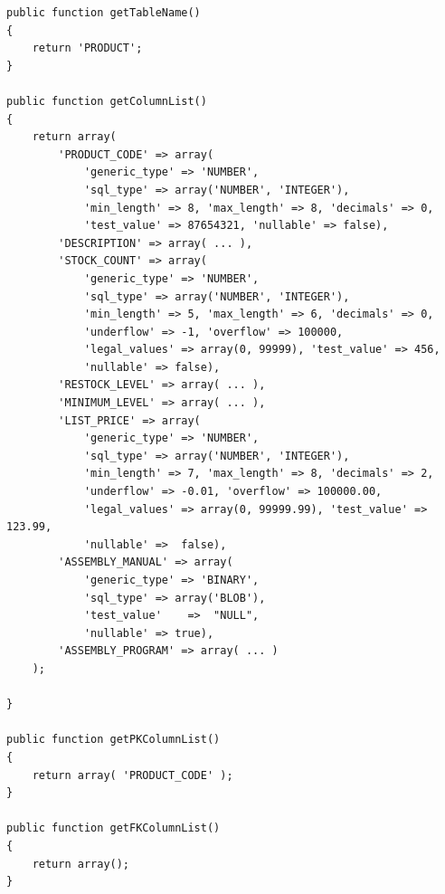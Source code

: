 \documentclass[sigconf, authordraft]{acmart}
\begin{document}
\begin{table}
    \footnotesize
    \begin{verbatim}
public function getTableName()
{
    return 'PRODUCT';
}

public function getColumnList()
{
    return array(
        'PRODUCT_CODE' => array(
            'generic_type' => 'NUMBER',
            'sql_type' => array('NUMBER', 'INTEGER'),
            'min_length' => 8, 'max_length' => 8, 'decimals' => 0,
            'test_value' => 87654321, 'nullable' => false),
        'DESCRIPTION' => array( ... ),
        'STOCK_COUNT' => array(
            'generic_type' => 'NUMBER',
            'sql_type' => array('NUMBER', 'INTEGER'),
            'min_length' => 5, 'max_length' => 6, 'decimals' => 0,
            'underflow' => -1, 'overflow' => 100000,
            'legal_values' => array(0, 99999), 'test_value' => 456,
            'nullable' => false),
        'RESTOCK_LEVEL' => array( ... ),
        'MINIMUM_LEVEL' => array( ... ),
        'LIST_PRICE' => array(
            'generic_type' => 'NUMBER',
            'sql_type' => array('NUMBER', 'INTEGER'),
            'min_length' => 7, 'max_length' => 8, 'decimals' => 2,
            'underflow' => -0.01, 'overflow' => 100000.00,
            'legal_values' => array(0, 99999.99), 'test_value' => 123.99,
            'nullable' =>  false),
        'ASSEMBLY_MANUAL' => array(
            'generic_type' => 'BINARY',
            'sql_type' => array('BLOB'),
            'test_value'    =>  "NULL",
            'nullable' => true),
        'ASSEMBLY_PROGRAM' => array( ... )
    );

}

public function getPKColumnList()
{
    return array( 'PRODUCT_CODE' );
}

public function getFKColumnList()
{
    return array();
}   \end{verbatim}
    \caption{Example of table specification}
\end{table}
\end{document}

